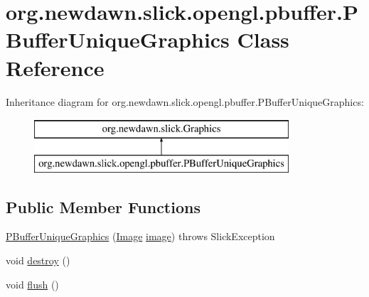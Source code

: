\hypertarget{classorg_1_1newdawn_1_1slick_1_1opengl_1_1pbuffer_1_1_p_buffer_unique_graphics}{}\section{org.\+newdawn.\+slick.\+opengl.\+pbuffer.\+P\+Buffer\+Unique\+Graphics Class Reference}
\label{classorg_1_1newdawn_1_1slick_1_1opengl_1_1pbuffer_1_1_p_buffer_unique_graphics}
Inheritance diagram for org.\+newdawn.\+slick.\+opengl.\+pbuffer.\+P\+Buffer\+Unique\+Graphics\+:\begin{figure}[H]
\begin{center}
\leavevmode
\includegraphics[height=2.000000cm]{classorg_1_1newdawn_1_1slick_1_1opengl_1_1pbuffer_1_1_p_buffer_unique_graphics}
\end{center}
\end{figure}
\subsection*{Public Member Functions}
\begin{DoxyCompactItemize}
\item 
\mbox{\hyperlink{classorg_1_1newdawn_1_1slick_1_1opengl_1_1pbuffer_1_1_p_buffer_unique_graphics_aa735f9549c24c0daf3ce3feedbbc9f2c}{P\+Buffer\+Unique\+Graphics}} (\mbox{\hyperlink{classorg_1_1newdawn_1_1slick_1_1_image}{Image}} \mbox{\hyperlink{classorg_1_1newdawn_1_1slick_1_1opengl_1_1pbuffer_1_1_p_buffer_unique_graphics_abc5d45be7087d1aeb486c2fae5c194ca}{image}})  throws Slick\+Exception 
\item 
void \mbox{\hyperlink{classorg_1_1newdawn_1_1slick_1_1opengl_1_1pbuffer_1_1_p_buffer_unique_graphics_a463287b4367d34b1e62b30d31c8530e2}{destroy}} ()
\item 
void \mbox{\hyperlink{classorg_1_1newdawn_1_1slick_1_1opengl_1_1pbuffer_1_1_p_buffer_unique_graphics_a82f5d8389d4081ddb925051ec6ff68ad}{flush}} ()
\end{DoxyCompactItemize}
